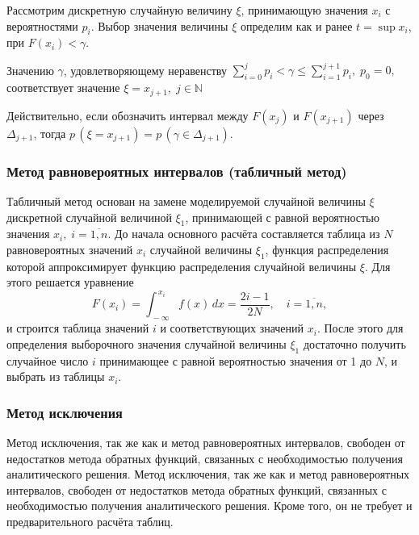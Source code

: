 \documentclass[
11pt,
master, %
subf, %
href, %
colorlinks=true, %
]{disser}
\begin{document}
Рассмотрим дискретную случайную величину $\xi $, принимающую значения $x_{i} $ с вероятностями $p_{i}$. Выбор значения величины $\xi $ определим как и ранее  $t=\sup x_{i} $, при $F(x_{i} )<\gamma $.

Значению $\gamma $, удовлетворяющему неравенству
$\sum\limits_{i=0}^{j}p_{i}  <\gamma \le \sum\limits_{i=1}^{j+1}p_{i}  ,\; p_{0} =0,$
соответствует значение $\xi =x_{j+1} ,\; j \in \mathbb{N}$

Действительно, если обозначить интервал между $F(x_{j} )$ и $F(x_{j+1} )$ через $\Delta _{j+1} $, тогда $p\, (\xi =x_{j+1} )=p\, (\gamma \in \Delta _{j+1} )$.

\subsubsection{Метод равновероятных интервалов (табличный метод)}

Табличный метод основан на замене моделируемой случайной величины $\xi $ дискретной случайной величиной $\xi _{1} $, принимающей с равной вероятностью значения $x_{i}, \;i = \overline{1,n}$. До начала основного расчёта составляется таблица из $N$ равновероятных значений $x_{i} $ случайной величины $\xi _{1} $, функция распределения которой аппроксимирует функцию распределения случайной величины $\xi $. Для этого решается уравнение
 $$
 F(x_{i} )=\int _{\, -\infty }^{\, x_{i} }f(x)\, dx= \frac{2i-1}{2N} ,\quad i=\overline{1,n},
 $$ и строится таблица значений $i$ и соответствующих значений $x_{i} $. После этого для определения выборочного значения случайной величины $\xi _{1} $ достаточно получить случайное число $i$ принимающее с равной вероятностью значения от 1 до $N$, и выбрать из таблицы $x_{i} $.

\subsubsection{Метод исключения}

Метод исключения, так же как и метод равновероятных интервалов, свободен от недостатков метода обратных функций, связанных с необходимостью получения аналитического решения. Метод исключения, так же как и метод равновероятных интервалов, свободен от недостатков метода обратных функций, связанных с необходимостью получения аналитического решения. Кроме того, он не требует и предварительного расчёта таблиц.
\end{document}
